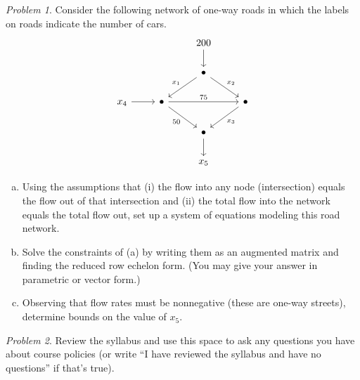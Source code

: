 \documentclass[11pt,twoside]{amsart}
\theoremstyle{plain}
\theoremstyle{remark}
\newtheorem{prob}{Problem}
\theoremstyle{definition}
\theoremstyle{definition}
\begin{document}
\begin{prob}
Consider the following network of one-way roads in which the labels on roads indicate the number of cars.
\[\begin{tikzcd}
  && 200 \\
  && \bullet \\
  {x_4} & \bullet && \bullet \\
  && \bullet \\
  && {x_5}
  \arrow[from=1-3, to=2-3]
  \arrow["{x_1}"', from=2-3, to=3-2]
  \arrow["{x_2}", from=2-3, to=3-4]
  \arrow[from=3-1, to=3-2]
  \arrow["75", from=3-2, to=3-4]
  \arrow["50"', from=3-2, to=4-3]
  \arrow["{x_3}", from=3-4, to=4-3]
  \arrow[from=4-3, to=5-3]
\end{tikzcd}\]
\begin{enumerate}[(a)]
\item Using the assumptions that (i) the flow into any node (intersection) equals the flow out of that intersection and (ii) the total flow into the network equals the total flow out, set up a system of equations modeling this road network.
\item Solve the constraints of (a) by writing them as an augmented matrix and finding the reduced row echelon form. (You may give your answer in parametric or vector form.)
\item Observing that flow rates must be nonnegative (these are one-way streets), determine bounds on the value of $x_5$.
\end{enumerate}
\end{prob}

\begin{prob}
Review the syllabus and use this space to ask any questions you have about course policies (or write ``I have reviewed the syllabus and have no questions'' if that's true).
\end{prob}
\end{document}
